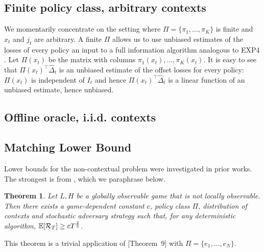 \documentclass[11pt]{article}
\newtheorem{theorem}{Theorem}
\begin{document}
\subsection{Finite policy class, arbitrary contexts}
We momentarily concentrate on the setting where  $\Pi = \{\pi_1,\ldots,\pi_K\}$ is finite and $x_t$ and $j_t$ are arbitrary. A finite $\Pi$ allows us to use unbiased estimates of the losses of every policy an input to a full information algorithm analogous to \textsc{EXP4}  \cite{auer2002exp4}. Let $\Pi(x_t)$ be the matrix with columns $\pi_1(x_t),\ldots, \pi_K(x_t)$. It is easy to see that $\Pi(x_t)^\top \hat\Delta_t$ is an unbiased estimate of the offset losses for every policy: $\Pi(x_t)$ is independent of $I_t$ and hence $\Pi(x_t)^\top\hat\Delta_t$ is a linear function of an unbiased estimate, hence unbiased.



\subsection{Offline oracle, i.i.d. contexts}




\subsection{Matching Lower Bound}
Lower bounds for the non-contextual problem were investigated in prior works. The strongest is from \cite{bartok2011minimax}, which we paraphrase below.
\begin{theorem}
  Let $L,H$ be a globally observable game that is not locally observable. Then there exists a game-dependent constant $c$, policy class $\Pi$, distribution of contexts and stochastic adversary strategy such that, for any deterministic algorithm, $\mathbb E[\mathcal R_T] \geq c T^{\frac23}$.
\end{theorem}
This theorem is a trivial application of \cite{bartok2011minimax}[Theorem~9] with $\Pi = \{e_1,\ldots,e_N\}$.
\end{document}
